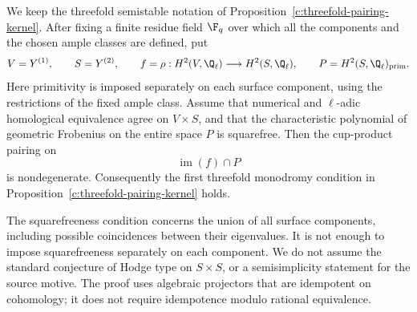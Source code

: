 \begin{proposition}
\label{c:threefold-simple-spectrum}
We keep the threefold semistable notation of
Proposition~\ref{c:threefold-pairing-kernel}. After fixing a finite
residue field $\F_q$ over which all the components and the chosen ample
classes are defined, put
\[
 V=Y^{(1)},\qquad S=Y^{(2)},\qquad
 f=\rho:H^2(V,\Q_\ell)\longrightarrow H^2(S,\Q_\ell),
 \qquad P=H^2(S,\Q_\ell)_{\rm prim}.
\]
Here primitivity is imposed separately on each surface component, using
the restrictions of the fixed ample class. Assume that numerical and
$\ell$-adic homological equivalence agree on $V\times S$, and that
the characteristic polynomial of geometric Frobenius on the entire
space $P$ is squarefree. Then the cup-product pairing on
\[
 \operatorname{im}(f)\cap P
\]
is nondegenerate. Consequently the first threefold monodromy condition
in Proposition~\ref{c:threefold-pairing-kernel} holds.

The squarefreeness condition concerns the union of all surface
components, including possible coincidences between their eigenvalues.
It is not enough to impose squarefreeness separately on each component.
We do not assume the standard conjecture of Hodge type on $S\times S$,
or a semisimplicity statement for the source motive. The proof uses
algebraic projectors that are idempotent on cohomology; it does not
require idempotence modulo rational equivalence.
\end{proposition}

